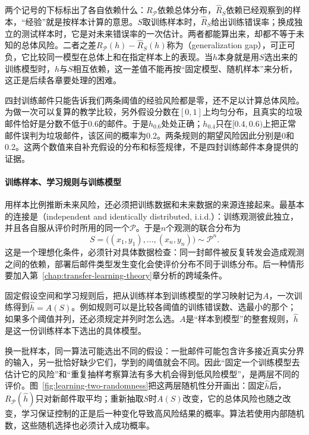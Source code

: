 两个记号的下标标出了各自依赖什么：$R_{\mathcal P}$依赖总体分布，$\hat R_S$依赖已经观察到的样本，“经验”就是按样本计算的意思。$S$取训练样本时，$\hat R_S$给出训练错误率；换成独立的测试样本时，它是对未来错误率的一次估计。两者都能算出来，却都不等于未知的总体风险。二者之差$R_{\mathcal P}(h)-\hat R_S(h)$称为（generalization gap），可正可负，它比较同一模型在总体上和在指定样本上的表现。当$h$本身就是用$S$选出来的训练模型时，$h$与$S$相互依赖，这一差值不能再按“固定模型、随机样本”来分析，这正是后续各章要处理的困难。

四封训练邮件只能告诉我们两条阈值的经验风险都是零，还不足以计算总体风险。为做一次可以复算的教学比较，另外假设分数在$[0,1]$上均匀分布，且真实的垃圾邮件恰好是分数不低于0.6的邮件。于是$h_{0.6}$处处正确；$h_{0.4}$只在$[0.4,0.6)$上把正常邮件误判为垃圾邮件，该区间的概率为0.2。两条规则的期望风险因此分别是0和0.2。这两个数值来自补充假设的分布和标签规律，不是四封训练邮件本身提供的证据。

\paragraph{训练样本、学习规则与训练模型}

用样本比例推断未来风险，还必须把训练数据和未来数据的来源连接起来。最基本的连接是（independent and identically distributed, i.i.d.）：训练观测彼此独立，并且各自服从评价时所用的同一个$\mathcal P$。于是$n$个观测的联合分布为
\begin{equation}
 S=\bigl((x_1,y_1),\ldots,(x_n,y_n)\bigr)\sim\mathcal P^n.
 \label{eq:training-sample-distribution}
\end{equation}
这是一个理想化条件，必须针对具体数据检查：同一封邮件被反复转发会造成观测之间的依赖，部署后邮件类型发生变化会使评价分布不同于训练分布。后一种情形要加入第~\ref{chap:transfer-learning-theory}章分析的跨域条件。

固定假设空间和学习规则后，把从训练样本到训练模型的学习映射记为$A$，一次训练得到$\hat h=A(S)$。例如规则可以是比较各阈值的训练错误数、选最小的那个；如果多个阈值并列，还必须规定并列时怎么选。$A$是“样本到模型”的整套规则，$\hat h$是这一份训练样本下选出的具体模型。

换一批样本，同一算法可能选出不同的假设：一批邮件可能包含许多接近真实分界的输入，另一批恰好缺少它们，学到的阈值就会不同。因此“固定一个训练模型去估计它的风险”和“重复抽样考察算法有多大机会得到低风险模型”，是两层不同的评价。图~\ref{fig:learning-two-randomness}把这两层随机性分开画出：固定$\hat h$后，$R_{\mathcal P}(\hat h)$只对新邮件取平均；重新抽取$S$时$A(S)$改变，它的总体风险也随之改变，学习保证控制的正是后一种变化导致高风险结果的概率。算法若使用内部随机数，这些随机选择也必须计入成功概率。

